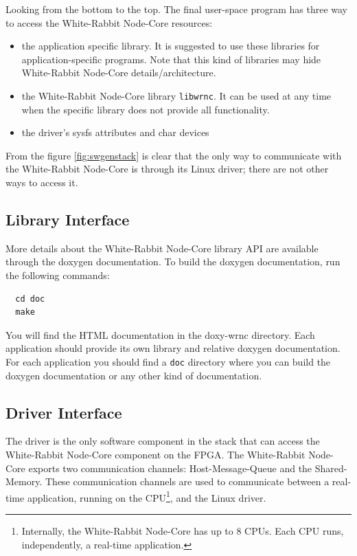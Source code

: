 \documentclass[a4paper,10pt]{article}
\begin{document}
Looking from the bottom to the top. The final user-space program has
three way to access the White-Rabbit Node-Core resources:

\begin{itemize}
  \item the application specific library. It is suggested to use these
    libraries for application-specific programs. Note that this kind of
    libraries may hide White-Rabbit Node-Core details/architecture.
  \item the White-Rabbit Node-Core library \texttt{libwrnc}. It can be
    used at any time when the specific library does not provide all
    functionality.
  \item the driver's sysfs attributes and char devices
\end{itemize}

From the figure \ref{fig:swgenstack} is clear that the only way to
communicate with the White-Rabbit Node-Core is through its Linux
driver; there are not other ways to access it.


\subsection{Library Interface}%
More details about the White-Rabbit Node-Core library API are
available through the doxygen documentation. To build the doxygen
documentation, run the following commands:

\begin{verbatim}
  cd doc
  make
\end{verbatim}

You will find the HTML documentation in the doxy-wrnc directory. Each
application should provide its own library and relative doxygen
documentation. For each application you should find a \texttt{doc}
directory where you can build the doxygen documentation or any other
kind of documentation.


\subsection{Driver Interface}%
The driver is the only software component in the stack that can access
the White-Rabbit Node-Core component on the FPGA. The White-Rabbit
Node-Core exports two communication channels: Host-Message-Queue and
the Shared-Memory. These communication channels are used to communicate
between a real-time application, running on the
CPU\footnote{Internally, the White-Rabbit Node-Core has up to 8 CPUs.
Each CPU runs, independently, a real-time application.}, and the Linux
driver.
\end{document}
